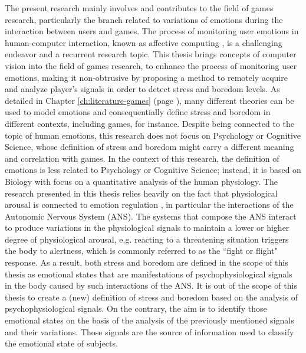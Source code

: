 The present research mainly involves and contributes to the field of games research, particularly the branch related to variations of emotions during the interaction between users and games. The process of monitoring user emotions in human-computer interaction, known as affective computing \parencite{picard2000affective}, is a challenging endeavor and a recurrent research topic. This thesis brings concepts of computer vision into the field of games research, to enhance the process of monitoring user emotions, making it non-obtrusive by proposing a method to remotely acquire and analyze player's signals in order to detect stress and boredom levels. As detailed in Chapter \ref{ch:literature-games} (page \pageref{ch:literature-games}), many different theories can be used to model emotions and consequentially define stress and boredom in different contexts, including games, for instance. Despite being connected to the topic of human emotions, this research does not focus on Psychology or Cognitive Science, whose definition of stress and boredom might carry a different meaning and correlation with games. In the context of this research, the definition of emotions is less related to Psychology or Cognitive Science; instead, it is based on Biology with focus on a quantitative analysis of the human physiology. The research presented in this thesis relies heavily on the fact that physiological arousal is connected to emotion regulation \parencite{appelhans2006heart,schubert2009effects}, in particular the interactions of the Autonomic Nervous System (ANS). The systems that compose the ANS interact to produce variations in the physiological signals to maintain a lower or higher degree of physiological arousal, e.g. reacting to a threatening situation triggers the body to alertness, which is commonly referred to as the ``fight or flight" response. As a result, both stress and boredom are defined in the scope of this thesis as emotional states that are manifestations of psychophysiological signals in the body caused by such interactions of the ANS. It is out of the scope of this thesis to create a (new) definition of stress and boredom based on the analysis of psychophysiological signals. On the contrary, the aim is to identify those emotional states on the basis of the analysis of the previously mentioned signals and their variations. Those signals are the source of information used to classify the emotional state of subjects.

